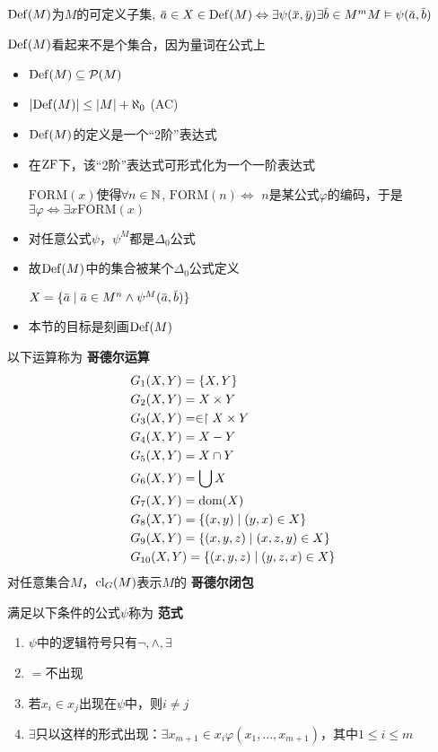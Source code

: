 \documentclass[11pt]{article}
\def \FORM {\text{FORM}}
\begin{document}
\(\operatorname{Def}(M)\)为\(M\)的可定义子集, \(\bara\in X\in\Def(M)\Leftrightarrow\exists\psi(\barx,\bary)\exists\barb\in M^m M\vDash\psi(\bara,\barb)\)

\(\operatorname{Def}(M)\)看起来不是个集合，因为量词在公式上

\begin{remark}
\begin{itemize}
\item \(\operatorname{Def}(M)\subseteq\mathcal{P}(M)\)
\item \(\abs{\Def(M)}\le\abs{M}+\aleph_0\) (AC)
\item \(\operatorname{Def}(M)\)的定义是一个“2阶”表达式
\item 在\(\operatorname{ZF}\)下，该“2阶”表达式可形式化为一个一阶表达式

\(\FORM(x)\)使得\(\forall n\in\mathbb{N}\), \(\FORM(n)\Leftrightarrow\) \(n\)是某公式\(\varphi\)的编码，于是\(\exists\varphi\Leftrightarrow\exists x\FORM(x)\)
\item 对任意公式\(\psi\)，\(\psi^M\)都是\(\Delta_0\)公式
\item 故\(\operatorname{Def}(M)\)中的集合被某个\(\Delta_0\)公式定义

\(X=\{\bara\mid\bara\in M^n\wedge\psi^M(\bara,\barb)\}\)
\item 本节的目标是刻画\(\operatorname{Def}(M)\)
\end{itemize}
\end{remark}

\begin{definition}[]
以下运算称为 \textbf{哥德尔运算}
\begin{align*}
&G_1(X,Y)=\{X,Y\}\\
&G_2(X,Y)=X\times Y\\
&G_3(X,Y)=\in\upharpoonright X\times Y\\
&G_4(X,Y)=X-Y\\
&G_5(X,Y)=X\cap Y\\
&G_6(X,Y)=\bigcup X\\
&G_7(X,Y)=\operatorname{dom}(X)\\
&G_8(X,Y)=\{(x,y)\mid(y,x)\in X\}\\
&G_9(X,Y)=\{(x,y,z)\mid(x,z,y)\in X\}\\
&G_{10}(X,Y)=\{(x,y,z)\mid(y,z,x)\in X\}\\
\end{align*}
对任意集合\(M\)，\(\operatorname{\text{cl}}_G(M)\)表示\(M\)的 \textbf{哥德尔闭包}
\end{definition}

\begin{definition}[]
满足以下条件的公式\(\psi\)称为 \textbf{范式}
\begin{enumerate}
\item \(\psi\)中的逻辑符号只有\(\neg,\wedge,\exists\)
\item \(=\)不出现
\item 若\(x_i\in x_j\)出现在\(\psi\)中，则\(i\neq j\)
\item \(\exists\)只以这样的形式出现：\(\exists x_{m+1}\in x_i\varphi(x_1,\dots,x_{m+1})\)，其中\(1\le i\le m\)
\end{enumerate}
\end{definition}
\end{document}
